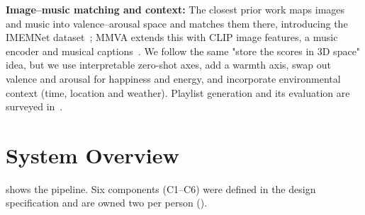 \documentclass{article}
\begin{document}
\textbf{Image--music matching and context:}
The closest prior work maps images and music into valence--arousal space and
matches them there, introducing the IMEMNet dataset~\cite{zhao2020imemnet};
MMVA extends this with CLIP image features, a music encoder and musical
captions~\cite{choi2025mmva}. We follow the same "store the scores in 3D space" idea, but we use
interpretable zero-shot axes, add a warmth axis, swap out valence and arousal for happiness and energy, 
and incorporate environmental context (time, location and weather). Playlist
generation and its evaluation are surveyed in~\cite{bonnin2014playlists}.

\section{System Overview}\label{sec:system}

 shows the pipeline. Six components (C1--C6) were defined
in the design specification and are owned two per person
().
\end{document}

